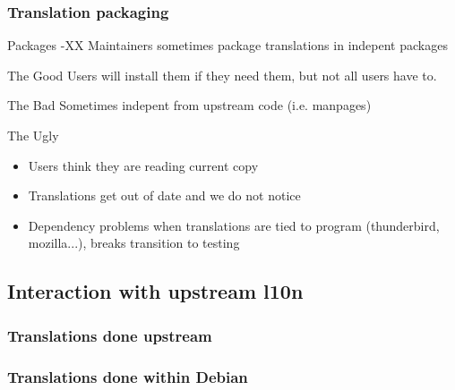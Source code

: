 \documentclass{beamer}
\begin{document}
\begin{frame}
  \frametitle{Translation packaging}
	\begin{block}
		{Packages -XX}
		Maintainers sometimes package translations in indepent packages
	\end{block}
	\begin{block}
		{The Good}
		Users will install them if they need them, but not all users have to.
	\end{block}
	\begin{block}
		{The Bad}
		Sometimes indepent from upstream code (i.e. manpages)
	\end{block}
	\begin{block}
		{The Ugly}
		\begin{itemize}
		\item Users think they are reading current copy
		\item Translations get out of date and we do not notice
		\item Dependency problems when translations are tied to program (thunderbird, mozilla...), breaks transition to testing
		\end{itemize}
	\end{block}
\end{frame}

\subsection{Interaction with upstream l10n}

\begin{frame}
  \frametitle{Translations done upstream}
\end{frame}

\begin{frame}
  \frametitle{Translations done within Debian}
\end{frame}
\end{document}
